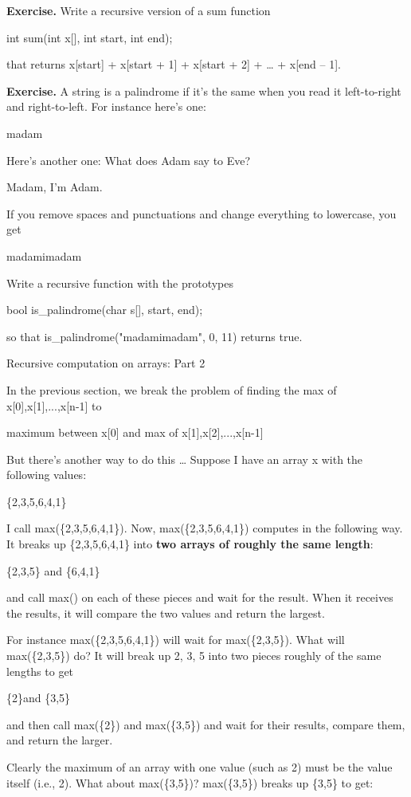 \documentclass[
]{article}
\begin{document}
\textbf{Exercise.} Write a recursive version of a sum function

int sum(int x{[}{]}, int start, int end);

that returns x{[}start{]} + x{[}start + 1{]} + x{[}start + 2{]} +
\ldots{} + x{[}end -- 1{]}.

\textbf{Exercise.} A string is a palindrome if it's the same when you
read it left-to-right and right-to-left. For instance here's one:

madam

Here's another one: What does Adam say to Eve?

Madam, I'm Adam.

If you remove spaces and punctuations and change everything to
lowercase, you get

madamimadam

Write a recursive function with the prototypes

bool is\_palindrome(char s{[}{]}, start, end);

so that is\_palindrome("madamimadam", 0, 11) returns true.

Recursive computation on arrays: Part 2

In the previous section, we break the problem of finding the max of
x{[}0{]},x{[}1{]},...,x{[}n-1{]} to

maximum between x{[}0{]} and max of x{[}1{]},x{[}2{]},...,x{[}n-1{]}

But there's another way to do this \ldots{} Suppose I have an array x
with the following values:

\{2,3,5,6,4,1\}

I call max(\{2,3,5,6,4,1\}). Now, max(\{2,3,5,6,4,1\}) computes in the
following way. It breaks up \{2,3,5,6,4,1\} into \textbf{two arrays of
roughly the same length}:

\{2,3,5\} and \{6,4,1\}

and call max() on each of these pieces and wait for the result. When it
receives the results, it will compare the two values and return the
largest.

For instance max(\{2,3,5,6,4,1\}) will wait for max(\{2,3,5\}). What
will max(\{2,3,5\}) do? It will break up 2, 3, 5 into two pieces roughly
of the same lengths to get

\{2\}and \{3,5\}

and then call max(\{2\}) and max(\{3,5\}) and wait for their results,
compare them, and return the larger.

Clearly the maximum of an array with one value (such as 2) must be the
value itself (i.e., 2). What about max(\{3,5\})? max(\{3,5\}) breaks up
\{3,5\} to get:
\end{document}
